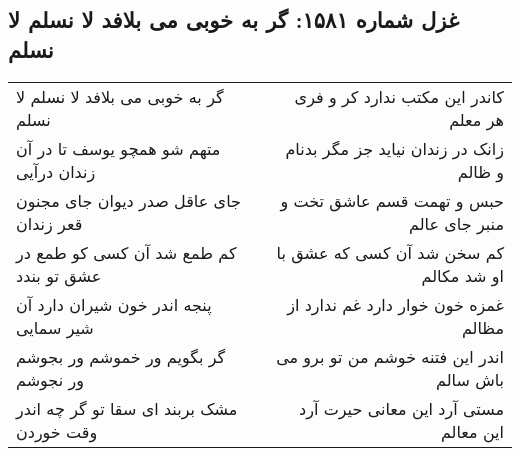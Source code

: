 \begin{center}
\section*{غزل شماره ۱۵۸۱: گر به خوبی می بلافد لا نسلم لا نسلم}
\label{sec:1581}
\begin{longtable}{l p{0.5cm} r}
گر به خوبی می بلافد لا نسلم لا نسلم
&&
کاندر این مکتب ندارد کر و فری هر معلم
\\
متهم شو همچو یوسف تا در آن زندان درآیی
&&
زانک در زندان نیاید جز مگر بدنام و ظالم
\\
جای عاقل صدر دیوان جای مجنون قعر زندان
&&
حبس و تهمت قسم عاشق تخت و منبر جای عالم
\\
کم طمع شد آن کسی کو طمع در عشق تو بندد
&&
کم سخن شد آن کسی که عشق با او شد مکالم
\\
پنجه اندر خون شیران دارد آن شیر سمایی
&&
غمزه خون خوار دارد غم ندارد از مظالم
\\
گر بگویم ور خموشم ور بجوشم ور نجوشم
&&
اندر این فتنه خوشم من تو برو می باش سالم
\\
مشک بربند ای سقا تو گر چه اندر وقت خوردن
&&
مستی آرد این معانی حیرت آرد این معالم
\\
\end{longtable}
\end{center}
